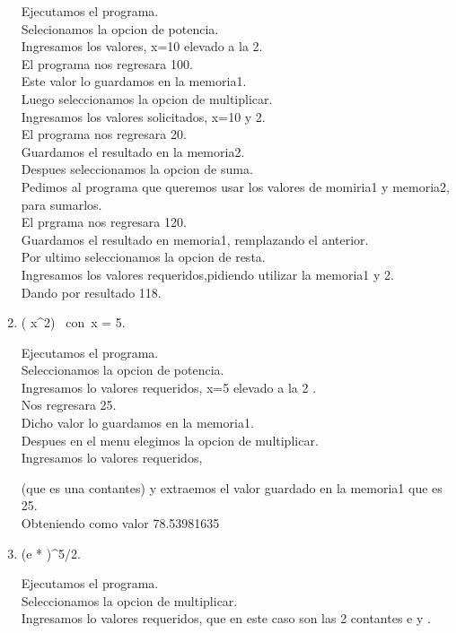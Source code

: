 \documentclass[a4paper,12pt]{article}
\begin{document}
\begin{enumerate}
Ejecutamos el programa.\\
Selecionamos la opcion de potencia.\\
Ingresamos los valores, x=10 elevado a la 2.\\
El programa nos regresara 100.\\
Este valor lo guardamos en la memoria1.\\
Luego seleccionamos la opcion de multiplicar.\\
Ingresamos los valores solicitados, x=10 y 2.\\
El programa nos regresara 20.\\
Guardamos el resultado en la memoria2.\\
Despues seleccionamos la opcion de suma.\\
Pedimos al programa que queremos usar los valores de momiria1 y memoria2, para sumarlos.\\
El prgrama nos regresara 120.\\
Guardamos el resultado en memoria1, remplazando el anterior.\\
Por ultimo seleccionamos la opcion de resta.\\
Ingresamos los valores requeridos,pidiendo utilizar la memoria1 y 2.\\
Dando por resultado 118.\\
  
\item( \pi * x^2)~ con~x = 5.
  
Ejecutamos el programa.\\
Seleccionamos la opcion de potencia.\\
Ingresamos lo valores requeridos, x=5 elevado a la 2 .\\
Nos regresara 25.\\
Dicho valor lo guardamos en la memoria1.\\
Despues en el menu elegimos la opcion de multiplicar.\\
Ingresamos lo valores requeridos, \pi 

(que es una contantes) y extraemos el valor guardado en la memoria1 que es 25.\\
Obteniendo como valor  78.53981635

\item (e * \pi)^5/2.
  
Ejecutamos el programa.\\
Seleccionamos la opcion de multiplicar.\\
Ingresamos lo valores requeridos, que en este caso son las 2 contantes e y \pi.


\end{enumerate}
\end{document}
